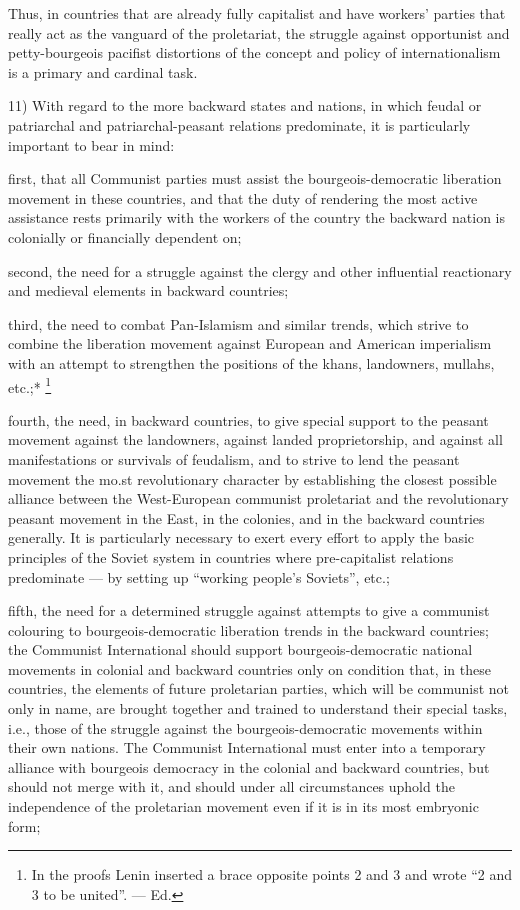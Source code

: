 Thus, in countries that are already fully capitalist and have workers’ parties that really act as the vanguard of the proletariat, the struggle against opportunist and petty-bourgeois pacifist distortions of the concept and policy of internationalism is a primary and cardinal task. 

11) With regard to the more backward states and nations, in which feudal or patriarchal and patriarchal-peasant relations predominate, it is particularly important to bear in mind: 

first, that all Communist parties must assist the bourgeois-democratic liberation movement in these countries, and that the duty of rendering the most active assistance rests primarily with the workers of the country the backward nation is colonially or financially dependent on; 

second, the need for a struggle against the clergy and other influential reactionary and medieval elements in backward countries; 

third, the need to combat Pan-Islamism and similar trends, which strive to combine the liberation movement against European and American imperialism with an attempt to strengthen the positions of the khans, landowners, mullahs, etc.;* 
\footnote{In the proofs Lenin inserted a brace opposite points 2 and 3 and wrote “2 and 3 to be united”. — Ed. }

fourth, the need, in backward countries, to give special support to the peasant movement against the landowners, against landed proprietorship, and against all manifestations or survivals of feudalism, and to strive to lend the peasant movement the mo.st revolutionary character by establishing the closest possible alliance between the West-European communist proletariat and the revolutionary peasant movement in the East, in the colonies, and in the backward countries generally. It is particularly necessary to exert every effort to apply the basic principles of the Soviet system in countries where pre-capitalist relations predominate — by setting up “working people’s Soviets”, etc.; 

fifth, the need for a determined struggle against attempts to give a communist colouring to bourgeois-democratic liberation trends in the backward countries; the Communist International should support bourgeois-democratic national movements in colonial and backward countries only on condition that, in these countries, the elements of future proletarian parties, which will be communist not only in name, are brought together and trained to understand their special tasks, i.e., those of the struggle against the bourgeois-democratic movements within their own nations. The Communist International must enter into a temporary alliance with bourgeois democracy in the colonial and backward countries, but should not merge with it, and should under all circumstances uphold the independence of the proletarian movement even if it is in its most embryonic form; 

